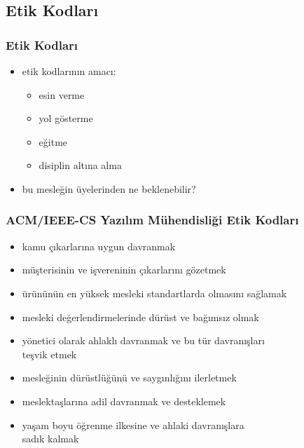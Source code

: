 \documentclass[dvipsnames]{beamer}
\theoremstyle{definition}
\theoremstyle{example}
\theoremstyle{plain}
\begin{document}
\subsection{Etik Kodları}

\begin{frame}
  \frametitle{Etik Kodları}

  \begin{itemize}
    \item etik kodlarının amacı:

    \begin{itemize}
      \item esin verme
      \item yol gösterme
      \item eğitme
      \item disiplin altına alma
    \end{itemize}

    \pause
    \item bu mesleğin üyelerinden ne beklenebilir?
  \end{itemize}
\end{frame}


\begin{frame}
  \frametitle{ACM/IEEE-CS Yazılım Mühendisliği Etik Kodları}

  \begin{itemize}
    \item kamu çıkarlarına uygun davranmak
    \item müşterisinin ve işvereninin çıkarlarını gözetmek
    \item ürününün en yüksek mesleki standartlarda olmasını sağlamak
    \item mesleki değerlendirmelerinde dürüst ve bağımsız olmak
    \item yönetici olarak ahlaklı davranmak ve bu tür davranışları\\
      teşvik etmek
    \item mesleğinin dürüstlüğünü ve saygınlığını ilerletmek
    \item meslektaşlarına adil davranmak ve desteklemek
    \item yaşam boyu öğrenme ilkesine ve ahlaki davranışlara\\
      sadık kalmak
  \end{itemize}
\end{frame}
\end{document}
